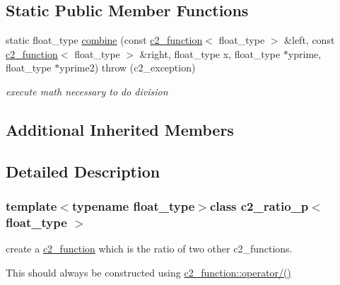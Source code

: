 \subsection*{Static Public Member Functions}
\begin{DoxyCompactItemize}
\item 
\hypertarget{classc2__ratio__p_a9b45af413e3861a37d169eefa8d93fb9}{static float\-\_\-type \hyperlink{classc2__ratio__p_a9b45af413e3861a37d169eefa8d93fb9}{combine} (const \hyperlink{classc2__function}{c2\-\_\-function}$<$ float\-\_\-type $>$ \&left, const \hyperlink{classc2__function}{c2\-\_\-function}$<$ float\-\_\-type $>$ \&right, float\-\_\-type x, float\-\_\-type $\ast$yprime, float\-\_\-type $\ast$yprime2)  throw (c2\-\_\-exception)}\label{classc2__ratio__p_a9b45af413e3861a37d169eefa8d93fb9}

\begin{DoxyCompactList}\small\item\em execute math necessary to do division \end{DoxyCompactList}\end{DoxyCompactItemize}
\subsection*{Additional Inherited Members}


\subsection{Detailed Description}
\subsubsection*{template$<$typename float\-\_\-type$>$class c2\-\_\-ratio\-\_\-p$<$ float\-\_\-type $>$}

create a \hyperlink{classc2__function}{c2\-\_\-function} which is the ratio of two other c2\-\_\-functions.

This should always be constructed using \hyperlink{classc2__function_a93ac28dfe5daebea84d147b8e346e60c}{c2\-\_\-function\-::operator/()} 

